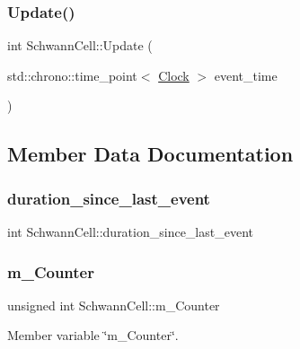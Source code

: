 \subsubsection{\texorpdfstring{Update()}{Update()}}
{\footnotesize\ttfamily int Schwann\+Cell\+::\+Update (\begin{DoxyParamCaption}\item[{std\+::chrono\+::time\+\_\+point$<$ \mbox{\hyperlink{universe_8h_a0ef8d951d1ca5ab3cfaf7ab4c7a6fd80}{Clock}} $>$}]{event\+\_\+time }\end{DoxyParamCaption})\hspace{0.3cm}{\ttfamily [private]}}



\subsection{Member Data Documentation}
\mbox{\label{classSchwannCell_ad2281f878b3aec7ce7ba31f27f698daa}} 
\subsubsection{\texorpdfstring{duration\+\_\+since\+\_\+last\+\_\+event}{duration\_since\_last\_event}}
{\footnotesize\ttfamily int Schwann\+Cell\+::duration\+\_\+since\+\_\+last\+\_\+event\hspace{0.3cm}{\ttfamily [private]}}

\mbox{\label{classSchwannCell_a6a72f907dbb2b8516f2292e0d82f887d}} 
\subsubsection{\texorpdfstring{m\+\_\+\+Counter}{m\_Counter}}
{\footnotesize\ttfamily unsigned int Schwann\+Cell\+::m\+\_\+\+Counter\hspace{0.3cm}{\ttfamily [private]}}



Member variable \char`\"{}m\+\_\+\+Counter\char`\"{}. 

